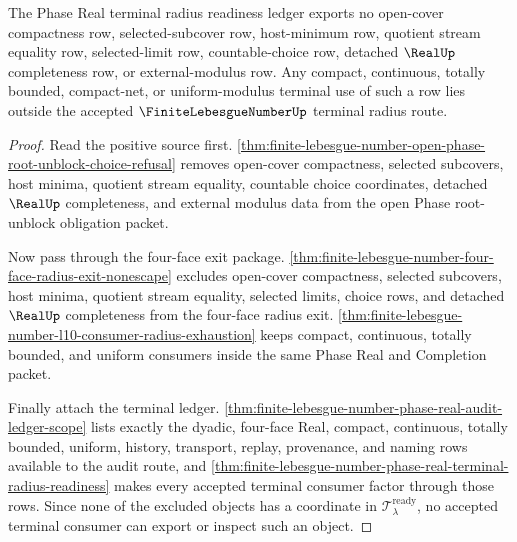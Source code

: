 \begin{theorem}
\label{thm:finite-lebesgue-number-phase-real-terminal-radius-nonescape}
The Phase Real terminal radius readiness ledger exports no open-cover compactness row, selected-subcover row, host-minimum row, quotient stream equality row, selected-limit row, countable-choice row, detached $\RealUp$ completeness row, or external-modulus row. Any compact, continuous, totally bounded, compact-net, or uniform-modulus terminal use of such a row lies outside the accepted $\FiniteLebesgueNumberUp$ terminal radius route.
\end{theorem}
\begin{proof}
Read the positive source first. \autoref{thm:finite-lebesgue-number-open-phase-root-unblock-choice-refusal} removes open-cover compactness, selected subcovers, host minima, quotient stream equality, countable choice coordinates, detached $\RealUp$ completeness, and external modulus data from the open Phase root-unblock obligation packet.

Now pass through the four-face exit package. \autoref{thm:finite-lebesgue-number-four-face-radius-exit-nonescape} excludes open-cover compactness, selected subcovers, host minima, quotient stream equality, selected limits, choice rows, and detached $\RealUp$ completeness from the four-face radius exit. \autoref{thm:finite-lebesgue-number-l10-consumer-radius-exhaustion} keeps compact, continuous, totally bounded, and uniform consumers inside the same Phase Real and Completion packet.

Finally attach the terminal ledger. \autoref{thm:finite-lebesgue-number-phase-real-audit-ledger-scope} lists exactly the dyadic, four-face Real, compact, continuous, totally bounded, uniform, history, transport, replay, provenance, and naming rows available to the audit route, and \autoref{thm:finite-lebesgue-number-phase-real-terminal-radius-readiness} makes every accepted terminal consumer factor through those rows. Since none of the excluded objects has a coordinate in $\mathcal{T}_{\lambda}^{\mathrm{ready}}$, no accepted terminal consumer can export or inspect such an object.
\end{proof}

